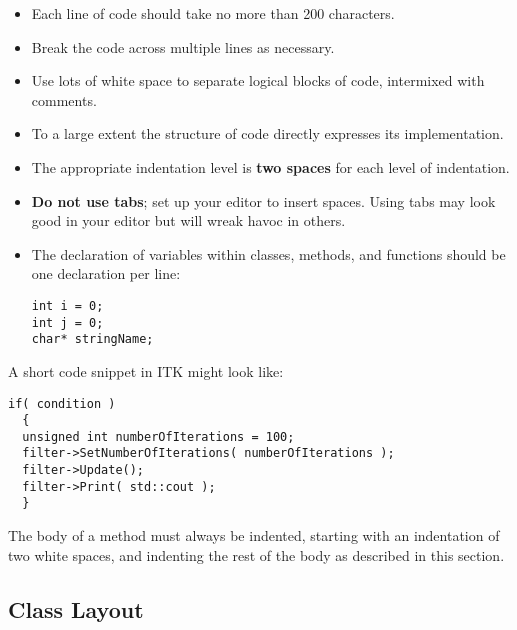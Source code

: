 \begin{itemize}
\item Each line of code should take no more than 200 characters.
\item Break the code across multiple lines as necessary.
\item Use lots of white space to separate logical blocks of code, intermixed
with comments.
\item To a large extent the structure of code directly expresses its
implementation.
\item The appropriate indentation level is \textbf{two spaces} for each level of
indentation.
\item \textbf{Do not use tabs}; set up your editor to insert spaces. Using tabs
may look good in your editor but will wreak havoc in others.
\item The declaration of variables within classes, methods, and functions should
be one declaration per line:

\small
\begin{verbatim}
int i = 0;
int j = 0;
char* stringName;
\end{verbatim}
\normalsize
\end{itemize}

A short code snippet in ITK might look like:

\small
\begin{verbatim}
if( condition )
  {
  unsigned int numberOfIterations = 100;
  filter->SetNumberOfIterations( numberOfIterations );
  filter->Update();
  filter->Print( std::cout );
  }
\end{verbatim}
\normalsize

The body of a method must always be indented, starting with an indentation of
two white spaces, and indenting the rest of the body as described in this
section.


\subsection{Class Layout}
\label{subsec:ClassLayout}

